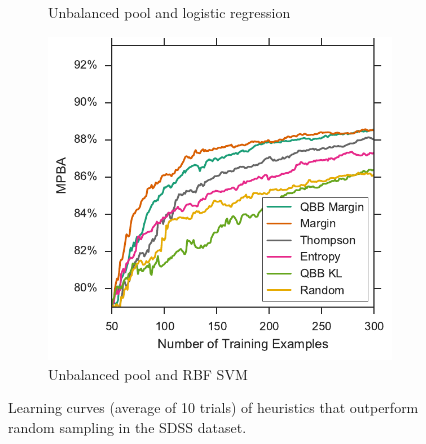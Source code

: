 \begin{figure}[p]
\begin{subfigure}{.5\textwidth}
		\caption{Unbalanced pool and logistic regression}
		\label{fig:sdss_ul_ind_upper}
	\end{subfigure}%
	\begin{subfigure}{.5\textwidth}
		\centering
		\includegraphics[width=\linewidth]{figures/5_active/sdss_ur_ind_upper}
		\caption{Unbalanced pool and RBF SVM}
		\label{fig:sdss_ur_ind_upper}
	\end{subfigure}
	\caption[Learning curves of heuristics better than random (SDSS)]{
		Learning curves (average of 10 trials) of heuristics that outperform random sampling in the SDSS dataset.}
	\label{fig:sdss_ind_upper}
\end{figure}


